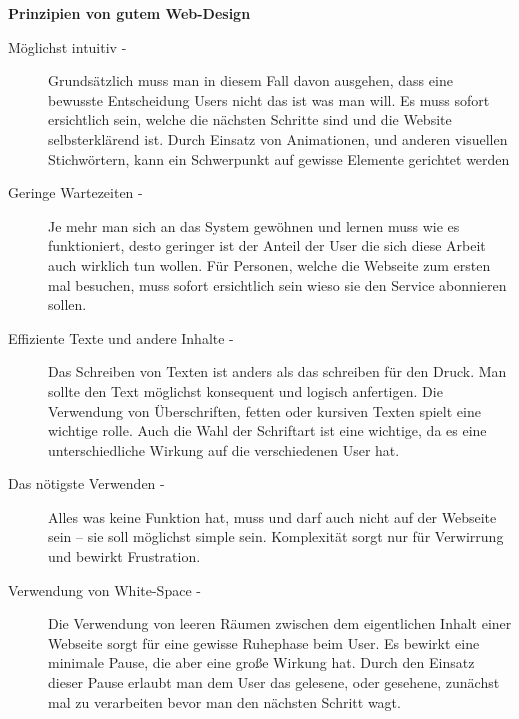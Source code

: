 \textbf{Prinzipien von gutem Web-Design}
\begin{description}
\item[Möglichst intuitiv -]
Grundsätzlich muss man in diesem Fall davon ausgehen, dass eine bewusste Entscheidung Users nicht das ist was man will. Es muss sofort ersichtlich sein, welche die nächsten Schritte sind und die Website selbsterklärend ist. Durch Einsatz von Animationen, und anderen visuellen Stichwörtern, kann ein Schwerpunkt auf gewisse Elemente gerichtet werden

\item[Geringe Wartezeiten -]
Je mehr man sich an das System gewöhnen und lernen muss wie es funktioniert, desto geringer ist der Anteil der User die sich diese Arbeit auch wirklich tun wollen. Für Personen, welche die Webseite zum ersten mal besuchen, muss sofort ersichtlich sein wieso sie den Service abonnieren sollen.

\item[Effiziente Texte und andere Inhalte -]
Das Schreiben von Texten ist anders als das schreiben für den Druck. Man sollte den Text möglichst konsequent und logisch anfertigen. Die Verwendung von Überschriften, fetten oder kursiven Texten spielt eine wichtige rolle. Auch die Wahl der Schriftart ist eine wichtige, da es eine unterschiedliche Wirkung auf die verschiedenen User hat.

\item[Das nötigste Verwenden -]
Alles was keine Funktion hat, muss und darf auch nicht auf der Webseite sein – sie soll möglichst simple sein. Komplexität sorgt nur für Verwirrung und bewirkt Frustration.

\item[Verwendung von White-Space -]
Die Verwendung von leeren Räumen zwischen dem eigentlichen Inhalt einer Webseite sorgt für eine gewisse Ruhephase beim User. Es bewirkt eine minimale Pause, die aber eine große Wirkung hat. Durch den Einsatz dieser Pause erlaubt man dem User das gelesene, oder gesehene, zunächst mal zu verarbeiten bevor man den nächsten Schritt wagt.
\end{description}


\clearpage